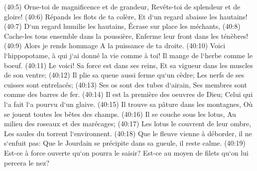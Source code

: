 \verse (40:5) Orne-toi de magnificence et de grandeur, Revêts-toi de splendeur et de gloire! 
\verse (40:6) Répands les flots de ta colère, Et d`un regard abaisse les hautains! 
\verse (40:7) D`un regard humilie les hautains, Écrase sur place les méchants, 
\verse (40:8) Cache-les tous ensemble dans la poussière, Enferme leur front dans les ténèbres! 
\verse (40:9) Alors je rends hommage A la puissance de ta droite. 
\verse (40:10) Voici l`hippopotame, à qui j`ai donné la vie comme à toi! Il mange de l`herbe comme le boeuf. 
\verse (40:11) Le voici! Sa force est dans ses reins, Et sa vigueur dans les muscles de son ventre; 
\verse (40:12) Il plie sa queue aussi ferme qu`un cèdre; Les nerfs de ses cuisses sont entrelacés; 
\verse (40:13) Ses os sont des tubes d`airain, Ses membres sont comme des barres de fer. 
\verse (40:14) Il est la première des oeuvres de Dieu; Celui qui l`a fait l`a pourvu d`un glaive. 
\verse (40:15) Il trouve sa pâture dans les montagnes, Où se jouent toutes les bêtes des champs. 
\verse (40:16) Il se couche sous les lotus, Au milieu des roseaux et des marécages; 
\verse (40:17) Les lotus le couvrent de leur ombre, Les saules du torrent l`environnent. 
\verse (40:18) Que le fleuve vienne à déborder, il ne s`enfuit pas: Que le Jourdain se précipite dans sa gueule, il reste calme. 
\verse (40:19) Est-ce à force ouverte qu`on pourra le saisir? Est-ce au moyen de filets qu`on lui percera le nez? 

